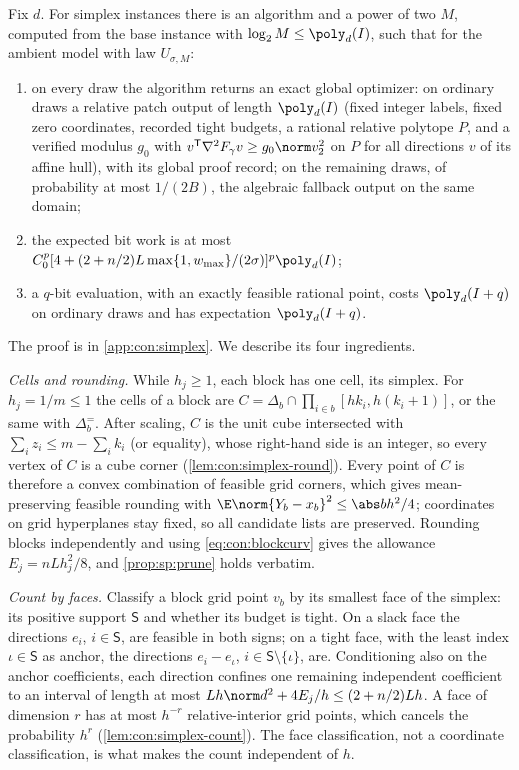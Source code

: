 \begin{theorem}\label{thm:con:simplex}
Fix $d$. For simplex instances there is an algorithm and a power of two $M$,
computed from the base instance with $\log_2M\le\poly_d(I)$, such that for
the ambient model with law $U_{\sigma,M}$:
\begin{enumerate}[label=(\roman*)]
\item on every draw the algorithm returns an exact global optimizer: on
ordinary draws a relative patch output of length $\poly_d(I)$ (fixed integer
labels, fixed zero coordinates, recorded tight budgets, a rational relative
polytope $P$, and a verified modulus $g_0$ with
$v^{\mathsf T}\nabla^2F_\gamma v\ge g_0\norm v_2^2$ on $P$ for all directions
$v$ of its affine hull), with its global proof record; on the remaining
draws, of probability at most $1/(2B)$, the algebraic fallback output on the
same domain;
\item the expected bit work is at most
$C_0^p[4+(2+n/2)L\max\{1,w_{\max}\}/(2\sigma)]^p\poly_d(I)$;
\item a $q$-bit evaluation, with an exactly feasible rational point, costs
$\poly_d(I+q)$ on ordinary draws and has expectation $\poly_d(I+q)$.
\end{enumerate}
\end{theorem}

The proof is in \cref{app:con:simplex}. We describe its four ingredients.

\emph{Cells and rounding.} While $h_j\ge1$, each block has one cell, its
simplex. For $h_j=1/m\le1$ the cells of a block are
$C=\Delta_b\cap\prod_{i\in b}[hk_i,h(k_i+1)]$, or the same with $\Delta^=_b$.
After scaling, $C$ is the unit cube intersected with $\sum_iz_i\le m-\sum_ik_i$
(or equality), whose right-hand side is an integer, so every vertex of $C$ is
a cube corner (\cref{lem:con:simplex-round}). Every point of $C$ is therefore
a convex combination of feasible grid corners, which gives mean-preserving
feasible rounding with $\E\norm{Y_b-x_b}^2\le\abs bh^2/4$; coordinates on
grid hyperplanes stay fixed, so all candidate lists are preserved. Rounding
blocks independently and using \eqref{eq:con:blockcurv} gives the allowance
$E_j=nLh_j^2/8$, and \cref{prop:sp:prune} holds verbatim.

\emph{Count by faces.} Classify a block grid point $v_b$ by its smallest face
of the simplex: its positive support $\mathsf S$ and whether its budget is
tight. On a slack face the directions $e_i$, $i\in\mathsf S$, are feasible
in both signs; on a tight face, with the least index $\iota\in\mathsf S$ as
anchor, the directions $e_i-e_\iota$, $i\in\mathsf S\setminus\{\iota\}$, are.
Conditioning also on the anchor coefficients, each direction confines one
remaining independent coefficient to an interval of length at most
$Lh\norm d^2+4E_j/h\le(2+n/2)Lh$. A face of dimension $r$ has at most $h^{-r}$
relative-interior grid points, which cancels the probability $h^r$
(\cref{lem:con:simplex-count}). The face classification, not a coordinate
classification, is what makes the count independent of $h$.


